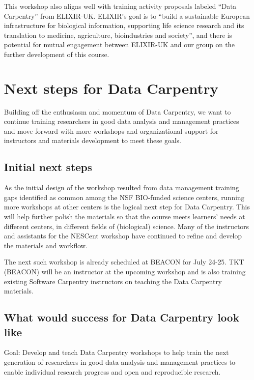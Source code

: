 \documentclass[11pt]{article}
\begin{document}
This workshop also aligns well with training activity proposals labeled ``Data Carpentry'' from ELIXIR-UK. ELIXIR's goal is to ``build a sustainable European infrastructure for biological information, supporting life science research and its translation to medicine, agriculture, bioindustries and society'', and there is potential for mutual engagement between ELIXIR-UK and our group on the further development of this course. 

\section{Next steps for Data Carpentry}

Building off the enthusiasm and momentum of Data Carpentry, we
want to continue training researchers in good data analysis and management practices and move forward with more workshops and organizational support for instructors and materials development to meet these goals.

\subsection{Initial next steps}

As the initial design of the workshop resulted from data management training gaps identified as common among the 
NSF BIO-funded science centers, running more workshops at other centers is the logical next step for Data Carpentry.
This will help further polish the materials so that the course meets learners' needs at different centers, in different
fields of (biological) science. Many of the instructors and assistants for the NESCent workshop have continued to refine and
develop the materials and workflow. 

The next such workshop is already scheduled at BEACON for July 24-25. TKT (BEACON) will be an instructor at the upcoming workshop and is also training existing Software Carpentry instructors on teaching the Data Carpentry materials. 

\subsection{What would success for Data Carpentry look like}

\hangindent=0.7cm Goal: Develop and teach Data Carpentry workshops to help train the next generation of researchers in good data analysis and management practices to enable individual research progress and open and reproducible research. 
\end{document}
